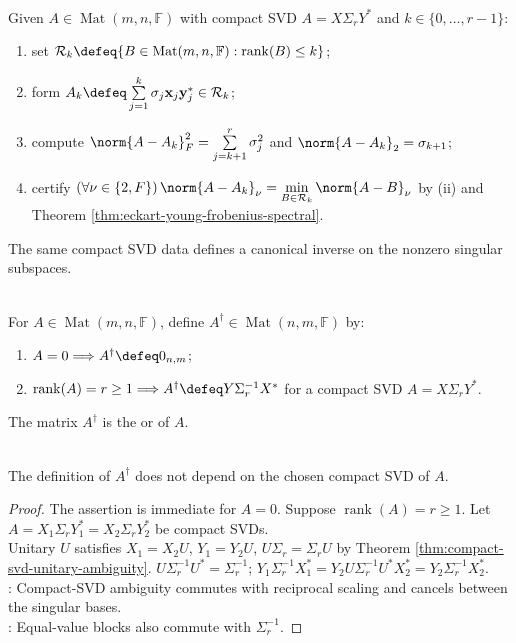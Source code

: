 \begin{computationmethod} \label{meth:truncated-svd-approximation} \\
Given $A\in\operatorname{Mat}(m,n,\mathbb{F})$ with compact SVD $A=X\Sigma_rY^*$ and $k\in\{0,\ldots,r-1\}$:
\begin{enumerate}[label=(\roman*)]
\setlength{\itemsep}{0pt}
\item set $\mathcal{R}_k\defeq\{B\in\operatorname{Mat}(m,n,\mathbb{F}):\operatorname{rank}(B)\leq k\}$;
\item form $A_k\defeq\sum\limits_{j=1}^{k}\sigma_j\mathbf{x}_j\mathbf{y}_j^*\in\mathcal{R}_k$;
\item compute $\norm{A-A_k}_F^2=\sum\limits_{j=k+1}^{r}\sigma_j^2$ and $\norm{A-A_k}_2=\sigma_{k+1}$;
\item certify $(\forall\nu\in\{2,F\})\,\norm{A-A_k}_{\nu}=\min\limits_{B\in\mathcal{R}_k}\norm{A-B}_{\nu}$ by (ii) and Theorem \ref{thm:eckart-young-frobenius-spectral}.
\end{enumerate}
\end{computationmethod}

The same compact SVD data defines a canonical inverse on the nonzero singular subspaces.

\begin{definition} \label{def:moore-penrose-pseudoinverse} \\
For $A\in\operatorname{Mat}(m,n,\mathbb{F})$, define $A^{\dagger}\in\operatorname{Mat}(n,m,\mathbb{F})$ by:
\begin{enumerate}[label=(\roman*)]
\setlength{\itemsep}{0pt}
\item $A=0\Longrightarrow A^{\dagger}\defeq0_{n,m}$;
\item $\operatorname{rank}(A)=r\geq1\Longrightarrow A^{\dagger}\defeq Y\Sigma_r^{-1}X^*$ for a compact SVD $A=X\Sigma_rY^*$.
\end{enumerate}
The matrix $A^{\dagger}$ is the  or  of $A$.
\end{definition}

\begin{proposition} \label{prop:pseudoinverse-well-defined} \\
The definition of $A^{\dagger}$ does not depend on the chosen compact SVD of $A$.
\begin{proof}
The assertion is immediate for $A=0$. Suppose $\operatorname{rank}(A)=r\geq1$. Let $A=X_1\Sigma_rY_1^*=X_2\Sigma_rY_2^*$ be compact SVDs.\\
Unitary $U$ satisfies $X_1=X_2U$, $Y_1=Y_2U$, $U\Sigma_r=\Sigma_rU$ by Theorem \ref{thm:compact-svd-unitary-ambiguity}. $U\Sigma_r^{-1}U^*=\Sigma_r^{-1}$; $Y_1\Sigma_r^{-1}X_1^*=Y_2U\Sigma_r^{-1}U^*X_2^*=Y_2\Sigma_r^{-1}X_2^*$.\\
: Compact-SVD ambiguity commutes with reciprocal scaling and cancels between the singular bases.\\
: Equal-value blocks also commute with $\Sigma_r^{-1}$.
\end{proof}
\end{proposition}

